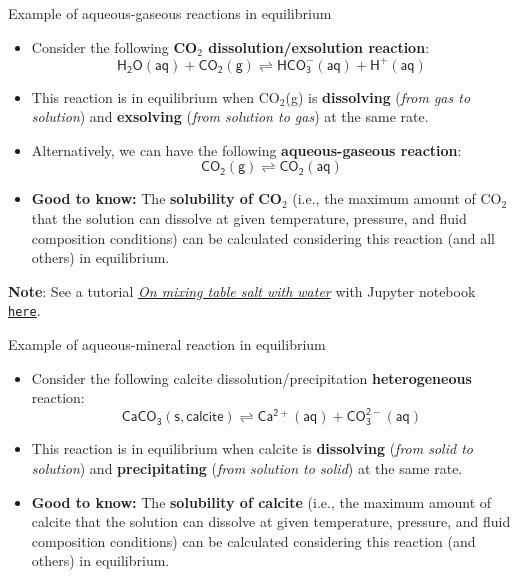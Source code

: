 \begin{frame}{Example of aqueous-gaseous reactions in equilibrium}
	\begin{itemize}
		\item Consider the following \alert{\bf CO$_{2}$ dissolution/exsolution reaction}:
	\[
	\mathsf{H_2O(aq) + CO_{2}(g) \rightleftharpoons HCO^-_3(aq) + H^+(aq)}
	\]
\vskip -10pt
\pause
\item This reaction is in equilibrium when CO$_{2}$(g) is \textbf{dissolving
}(\emph{from gas to solution}) and \textbf{exsolving} (\emph{from
solution to gas}) at the same rate. 
	\pause
\item Alternatively, we can have the following \alert{\bf aqueous-gaseous reaction}:
%
\[
\mathsf{CO_{2}(g) \rightleftharpoons CO_2(aq)}
\]
\vskip -10pt
%
	\pause
\item \alert{\textbf{Good to know:}} The \textbf{solubility of
CO$_{2}$} (i.e., the maximum amount of CO$_{2}$ that the solution
can dissolve at given temperature, pressure, and fluid composition
conditions) can be calculated considering this reaction (and all others)
in equilibrium.
\end{itemize}
%
	\pause
\alert{\textbf{Note}}: See a tutorial \href{https://reaktoro.org/applications/miscellaneous/opening-bottle-with-sparkling-water.html}{\textcolor{indigo(dye)}{\it On mixing table salt with water}} with Jupyter notebook \href{https://github.com/mtsveta/reaktoro-v2-workshop/blob/main/tutorials/applications/opening-bottel-with-soda.ipynb}{\textcolor{indigo(dye)}{\tt here}}.
%
\end{frame}
%
%
\begin{frame}[<+->]{Example of aqueous-mineral reaction in equilibrium}
\begin{itemize}
\item Consider the following calcite dissolution/precipitation \textbf{heterogeneous} reaction:
\[
\mathrm{\mathsf{CaCO_{3}(s,calcite) \rightleftharpoons Ca^{2+}(aq)+CO_{3}^{2-}(aq)}}
\]
\item This reaction is in equilibrium when calcite is \textbf{dissolving
}(\emph{from solid to solution}) and \textbf{precipitating} (\emph{from
solution to solid}) at the same rate. 
\item \textbf{\alert{\textbf{Good to know:}}} The \textbf{solubility of
calcite} (i.e., the maximum amount of calcite that the solution can
dissolve at given temperature, pressure, and fluid composition conditions)
can be calculated considering this reaction (and others) in equilibrium.
\end{itemize}
\end{frame}


